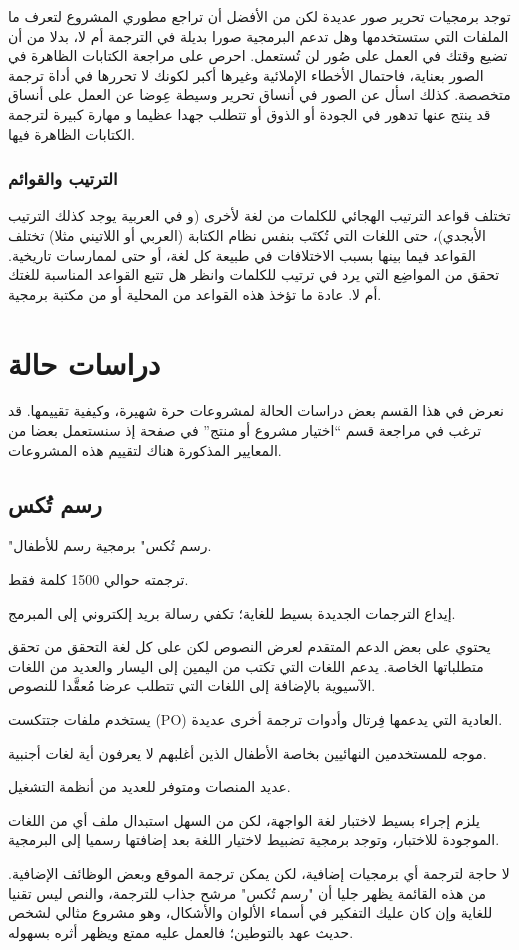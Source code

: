 توجد برمجيات تحرير صور عديدة لكن من الأفضل أن تراجع مطوري المشروع لتعرف
ما الملفات التي ستستخدمها وهل تدعم البرمجية صورا بديلة في الترجمة أم
لا، بدلا من أن تضيع وقتك في العمل على صُور لن تُستعمل. احرص على مراجعة
الكتابات الظاهرة في الصور بعناية، فاحتمال الأخطاء الإملائية وغيرها أكبر
لكونك لا تحررها في أداة ترجمة متخصصة. كذلك اسأل عن الصور في أنساق تحرير
وسيطة عِوضا عن العمل على أنساق قد ينتج عنها تدهور في الجودة أو الذوق أو
تتطلب جهدا عظيما و مهارة كبيرة لترجمة الكتابات الظاهرة فيها.

\subsection{الترتيب والقوائم}
تختلف قواعد الترتيب الهجائي للكلمات من لغة لأخرى (و في العربية يوجد كذلك
الترتيب الأبجدي)، حتى اللغات التي تُكتَب بنفس نظام الكتابة (العربي أو
اللاتيني مثلا) تختلف القواعد فيما بينها بسبب الاختلافات في طبيعة كل
لغة، أو حتى لممارسات تاريخية. تحقق من المواضِع التي يرد في ترتيب
للكلمات وانظر هل تتبع القواعد المناسبة للغتك أم لا. عادة ما تؤخذ هذه
القواعد من المحلية أو من مكتبة برمجية.

\chapter{دراسات حالة}
نعرض في هذا القسم بعض دراسات الحالة لمشروعات حرة شهيرة، وكيفية تقييمها.
قد ترغب في مراجعة قسم “اختيار مشروع أو منتج” في صفحة
\at[ref:36346325] إذ سنستعمل بعضا من المعايير المذكورة هناك
لتقييم هذه المشروعات.

\section[ref:34376426]{رسم تُكس}
"رسم تُكس" برمجية رسم للأطفال.

\startitemize[1]
\item ترجمته حوالي 1500 كلمة فقط.
\item إيداع الترجمات الجديدة بسيط للغاية؛ تكفي رسالة بريد إلكتروني إلى
المبرمج.
\item يحتوي على بعض الدعم المتقدم لعرض النصوص لكن على كل لغة التحقق من
تحقق متطلباتها الخاصة. يدعم اللغات التي تكتب من اليمين إلى اليسار
والعديد من اللغات الآسيوية بالإضافة إلى اللغات التي تتطلب عرضا مُعقَّدا
للنصوص.
\item يستخدم ملفات جتتكست (PO) العادية التي يدعمها فِرتال وأدوات ترجمة
أخرى عديدة.
\item موجه للمستخدمين النهائيين بخاصة الأطفال الذين أغلبهم لا يعرفون أية
لغات أجنبية.
\item عديد المنصات ومتوفر للعديد من أنظمة التشغيل.
\item يلزم إجراء بسيط لاختبار لغة الواجهة، لكن من السهل استبدال ملف أي
من اللغات الموجودة للاختبار، وتوجد برمجية تضبيط لاختيار اللغة بعد
إضافتها رسميا إلى البرمجية.
\item لا حاجة لترجمة أي برمجيات إضافية، لكن يمكن ترجمة الموقع وبعض
الوظائف الإضافية.
\stopitemize
من هذه القائمة يظهر جليا أن "رسم تُكس" مرشح جذاب للترجمة، والنص ليس
تقنيا للغاية وإن كان عليك التفكير في أسماء الألوان والأشكال، وهو مشروع
مثالي لشخص حديث عهد بالتوطين؛ فالعمل عليه ممتع ويظهر أثره بسهوله.

